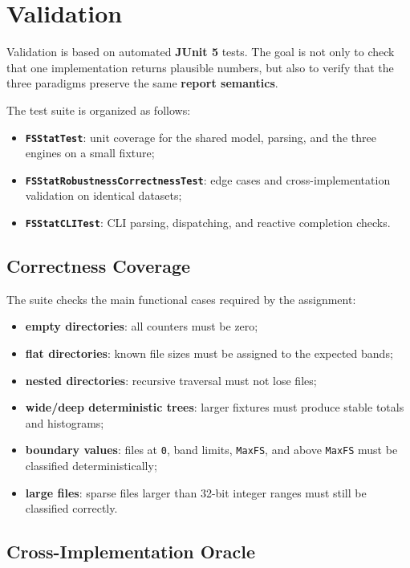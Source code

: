 \clearpage
\section{Validation}

Validation is based on automated \textbf{JUnit 5} tests. The goal is not only
to check that one implementation returns plausible numbers, but also to verify
that the three paradigms preserve the same \textbf{report semantics}.

The test suite is organized as follows:

\begin{itemize}
  \item \textbf{\texttt{FSStatTest}}: unit coverage for the shared model,
  parsing, and
  the three engines on a small fixture;
  \item \textbf{\texttt{FSStatRobustnessCorrectnessTest}}: edge cases and
  cross-implementation validation on identical datasets;
  \item \textbf{\texttt{FSStatCLITest}}: CLI parsing, dispatching, and reactive
  completion checks.
\end{itemize}

\subsection{Correctness Coverage}

The suite checks the main functional cases required by the assignment:

\begin{itemize}
  \item \textbf{empty directories}: all counters must be zero;
  \item \textbf{flat directories}: known file sizes must be assigned to the
  expected bands;
  \item \textbf{nested directories}: recursive traversal must not lose files;
  \item \textbf{wide/deep deterministic trees}: larger fixtures must produce
  stable totals and histograms;
  \item \textbf{boundary values}: files at \texttt{0}, band limits,
  \texttt{MaxFS}, and above \texttt{MaxFS} must be classified
  deterministically;
  \item \textbf{large files}: sparse files larger than 32-bit integer ranges
  must still be classified correctly.
\end{itemize}

\subsection{Cross-Implementation Oracle}

